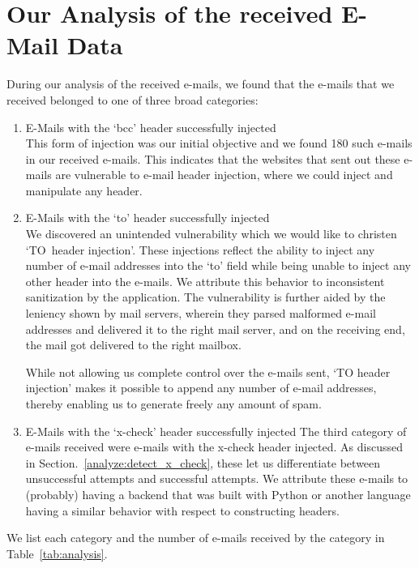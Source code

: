 \section[Analysis of Data]{Our Analysis of the received E-Mail Data}
During our analysis of the received e-mails, we found that the e-mails that we received belonged to one of three broad categories:
\begin{enumerate}
	\item E-Mails with the `bcc' header successfully injected\\
	This form of injection was our initial objective and we found 180 such e-mails in our received e-mails. This indicates that the websites that sent out these e-mails are vulnerable to e-mail header injection, where we could inject and manipulate any header.
	
	\item E-Mails with the `to' header successfully injected\\
	We discovered an unintended vulnerability which we would like to christen `TO~header injection'. These injections reflect the ability to inject any number of e-mail addresses into the `to' field while being unable to inject any other header into the e-mails. We attribute this behavior to inconsistent sanitization by the application. 
	The vulnerability is further aided by the leniency shown by mail servers, wherein they parsed malformed e-mail addresses and delivered it to the right mail server, and on the receiving end, the mail got delivered to the right mailbox. 
	
	While not allowing us complete control over the e-mails sent, `TO header injection' makes it possible to append any number of e-mail addresses, thereby enabling us to generate freely any amount of spam.
	
	\item E-Mails with the `x-check' header successfully injected
    The third category of e-mails received were e-mails with the x-check header injected. As discussed in Section.~\ref{analyze:detect_x_check}, 
    these let us differentiate between unsuccessful attempts and successful attempts. We attribute these e-mails to (probably) having a backend that was built with Python or another language having a similar behavior with respect to constructing headers.
\end{enumerate}
We list each category and the number of e-mails received by the category in Table~\ref{tab:analysis}.

